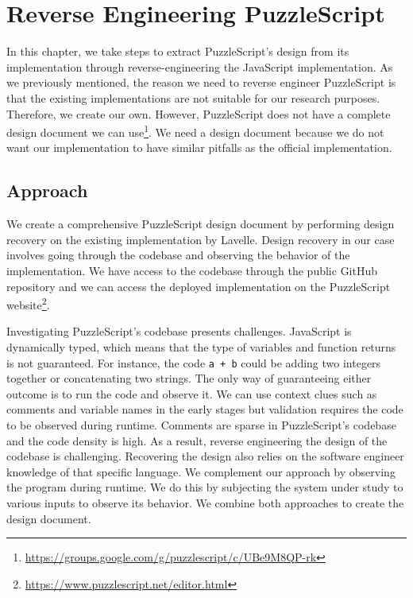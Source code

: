 \chapter{Reverse Engineering PuzzleScript}
\label{ch:puzzlescript}
In this chapter, we take steps to extract PuzzleScript's design from its implementation through reverse-engineering the JavaScript implementation. As we previously mentioned, the reason we need to reverse engineer PuzzleScript is that the existing implementations are not suitable for our research purposes. Therefore, we create our own. However, PuzzleScript does not have a complete design document we can use\footnote{\url{https://groups.google.com/g/puzzlescript/c/UBe9M8QP-rk}}. We need a design document because we do not want our implementation to have similar pitfalls as the official implementation.



\section{Approach}
We create a comprehensive PuzzleScript design document by performing design recovery on the existing implementation by Lavelle. Design recovery in our case involves going through the codebase and observing the behavior of the implementation. We have access to the codebase through the public GitHub repository and we can access the deployed implementation on the PuzzleScript website\footnote{\url{https://www.puzzlescript.net/editor.html}}.

Investigating PuzzleScript's codebase presents challenges. JavaScript is dynamically typed, which means that the type of variables and function returns is not guaranteed. For instance, the code \texttt{a + b} could be adding two integers together or concatenating two strings. The only way of guaranteeing either outcome is to run the code and observe it. We can use context clues such as comments and variable names in the early stages but validation requires the code to be observed during runtime. Comments are sparse in PuzzleScript's codebase and the code density is high. As a result, reverse engineering the design of the codebase is challenging. Recovering the design also relies on the software engineer knowledge of that specific language. We complement our approach by observing the program during runtime. We do this by subjecting the system under study to various inputs to observe its behavior. We combine both approaches to create the design document.

